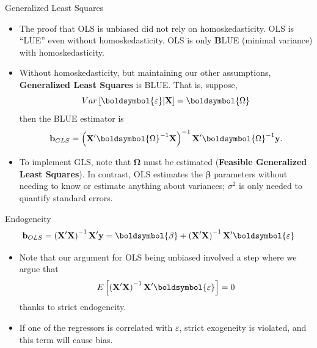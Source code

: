 \documentclass[aspectratio=169,11pt]{beamer}
\begin{document}
\begin{frame}{Generalized Least Squares}
\begin{itemize}
	\item The proof that OLS is unbiased did not rely on homoskedasticity. OLS
	is ``LUE'' even without homoskedasticity. OLS is only {\bf B}LUE (minimal variance) with homoskedasticity.

	\smallskip
	\item Without homoskedasticity, but maintaining our other assumptions, {\bf Generalized
		Least Squares} is BLUE. That is, suppose,\[
	Var\left[\boldsymbol{\varepsilon} | {\bf X} \right] = \boldsymbol{\Omega}
	\]
	then the BLUE estimator is \[
	{\bf b}_{GLS} = \left({\bf X}'\boldsymbol{\Omega}^{-1}{\bf X}\right)^{-1} {\bf X}' \boldsymbol{\Omega}^{-1}{\bf y} .
	\]
	
	\smallskip
	\item To implement GLS, note that $\boldsymbol{\Omega}$ must be estimated ({\bf Feasible Generalized
		Least Squares}). In contrast, OLS estimates the $\boldsymbol{\beta}$ parameters without needing to know or estimate
		anything about variances; $\sigma^2$ is only needed to quantify standard errors. 
\end{itemize}
\end{frame}



\begin{frame}{Endogeneity}
\[
	{\bf b}_{OLS} = \left({\bf X}'{\bf X}\right)^{-1} {\bf X}' {\bf y} = \boldsymbol{\beta}  + \left({\bf X}'{\bf X}\right)^{-1} {\bf X}' \boldsymbol{\varepsilon}
	\]
\begin{itemize}
		\item Note that our argument for OLS being unbiased involved a step where we argue that \[
	E\left[\left({\bf X}'{\bf X}\right)^{-1} {\bf X}' \boldsymbol{\varepsilon}\right] =0
	\]
	thanks to strict endogeneity.

	\medskip
	\item If one of the regressors is correlated with $\varepsilon$, strict exogeneity is violated, and this term will cause bias. 

\end{itemize}
\end{frame}
\end{document}
